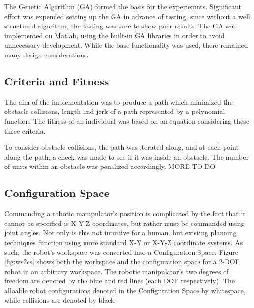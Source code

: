 	
		
			
		

The Genetic Algorithm (GA) formed the basis for the experiemnts. Significant effort was expended setting up the GA in advance of testing, since without a well structured algorithm, the testing was sure to show poor results. The GA was implemented on Matlab, using the built-in GA libraries in order to avoid unnecessary development. While the base functionality was used, there remained many design considerations.

\subsection{Criteria and Fitness}
The aim of the implementation was to produce a path which minimized the obstacle collisions, length and jerk of a path represented by a polynomial function. The fitness of an individual was based on an equation considering these three criteria.

To consider obstacle collisions, the path was iterated along, and at each point along the path, a check was made to see if it was inside an obstacle. The number of units within an obstacle was penalized accordingly. MORE TO DO

\subsection{Configuration Space}
Commanding a robotic manipulator's position is complicated by the fact that it cannot be specified is X-Y-Z coordinates, but rather must be commanded using joint angles. Not only is this not intuitive for a human, but existing planning techniques function using more standard X-Y or X-Y-Z coordinate systems. As such, the robot's workspace was converted into a Configuration Space. Figure \ref{fig:ws2cs} shows both the workspace and the configuration space for a 2-DOF robot in an arbitrary workspace. The robotic manipulator's two degrees of freedom are denoted by the blue and red lines (each DOF respectively). The alloable robot configurations denoted in the Configuration Space by whitespace, while collisions are denoted by black.


